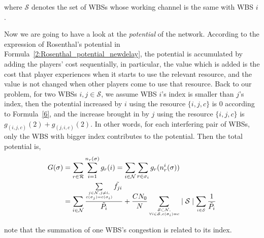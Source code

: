 where $\mathcal{S}$ denotes the set of WBSs whose working channel is the same with WBS $i$.

Now we are going to have a look at the \textit{potential} of the network.
According to the expression of Rosenthal's potential in Formula~\ref{2:Rosenthal_potential_newdelay}, the potential is accumulated by adding the players' cost sequentially, in particular, the value which is added is the cost that player experiences when it starts to use the relevant resource, and the value is not changed when other players come to use that resource.
Back to our problem, for two WBSs $i,j\in \mathcal{S}$, we assume WBS $i$'s index is smaller than $j$'s index, then the potential increased by $i$ using the resource $\{i,j,c\}$ is 0 according to Formula~\ref{6}, and the increase brought in by $j$ using the resource $\{i,j,c\}$ is $g_{(i,j,c)}(2)+g_{(j,i,c)}(2)$. 
In other words, for each interfering pair of WBSs, only the WBS with bigger index contributes to the potential. 
Then the total potential is, 
\begin{equation}
\label{allPotential}
\begin{split}	
G(\sigma) 
& =\sum\limits^{}_{r\in \mathcal{R}} \sum\limits^{n_r(\sigma)}_{i=1} g_r(i)  =\sum\limits_{i\in \mathcal{N}} \sum\limits^{}_{r\in \sigma_i} g_r(n_r^i(\sigma))\\
& = \sum\limits_{i\in \mathcal{N}}\dfrac{\sum\limits_{\tiny\substack{j\in \mathcal{N}, j\ne i,\\ c(\sigma_j)=c(\sigma_i)}}\tilde{f_{ji}}}{\tilde{P_i}} + \dfrac{CN_0}{N}\sum\limits_{\tiny\substack{\mathcal{S}\subset \mathcal{N},\\ \forall i\in \mathcal{S}, c(\sigma_i)=c}} \mid \mathcal{S}\mid   \sum\limits_{\tiny\substack{i\in \mathcal{S}}}\frac{1}{\tilde{P_i}}
\end{split}
\end{equation}

 note that the summation of one WBS's congestion is related to its index. 

%


